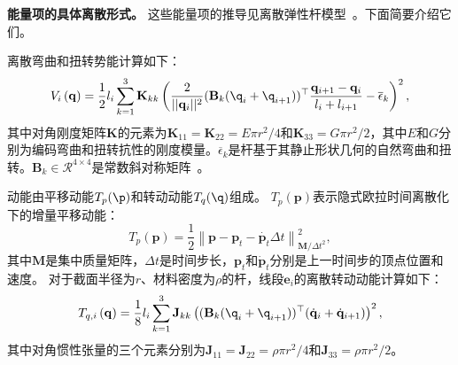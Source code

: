 \noindent\textbf{能量项的具体离散形式。}
\label{app:energies}
这些能量项的推导见离散弹性杆模型~\cite{spillmann_corde_2007}。下面简要介绍它们。

离散弯曲和扭转势能计算如下：
\begin{equation}
 V_{i}\left(\mathbf{q}\right) = \frac{1}{2}l_i\sum_{k=1}^3 \mathbf{K}_{kk}\left(\frac{2}{||\mathbf{q}_i||^2} (\mathbf{B}_k(\q_i+\q_{i+1}))^{\top}\frac{\mathbf{q}_{i+1} -  \mathbf{q}_{i}}{l_i+l_{i+1}}- \overline{\epsilon}_k\right)^2,
 \label{eq:V_q}
\end{equation}
其中对角刚度矩阵$\mathbf K$的元素为$\mathbf K_{11} = \mathbf{K}_{22} =  E\pi r^2/4$和$\mathbf K_{33} = G\pi r^2/2$，其中$E$和$G$分别为编码弯曲和扭转抗性的刚度模量。$\overline{\epsilon}_k$是杆基于其静止形状几何的自然弯曲和扭转。$\mathbf B_k \in \mathcal R^{4\times 4}$是常数斜对称矩阵~\cite{spillmann_corde_2007}。

动能由平移动能$T_p(\p)$和转动动能$T_q(\q)$组成。
$T_p\left(\mathbf p \right)$表示隐式欧拉时间离散化下的增量平移动能：
\begin{equation}
  T_p\left(\mathbf p \right)=\frac{1}{2}\left\|\mathbf{p}-\mathbf{p}_{t}-\dot{\mathbf{p}_{t}}\Delta t\right\|_{\mathbf{M} / \Delta t^{2}}^{2},
\end{equation}
其中$\mathbf{M}$是集中质量矩阵，$\Delta t$是时间步长，$\mathbf{p}_{t}$和$\dot{\mathbf{p}}_{t}$分别是上一时间步的顶点位置和速度。
对于截面半径为$r$、材料密度为$\rho$的杆，线段$\mathbf{e}_i$的离散转动动能计算如下：
\begin{equation}
 T_{q,i}\left(\mathbf{q}\right)= \frac{1}{8}l_i\sum_{k=1}^3 \mathbf{J}_{kk}\left( (\mathbf{B}_k(\q_i+\q_{i+1}))^{\top}(\dot{\mathbf{q}}_i+  \dot{\mathbf{q}}_{i+1} ) \right)^2,
 \label{eq:T_q}
\end{equation}
其中对角惯性张量的三个元素分别为$\mathbf{J}_{11}=\mathbf{J}_{22}=\rho\pi r^2/4$和$\mathbf{J}_{33}=\rho\pi r^2/2$。

